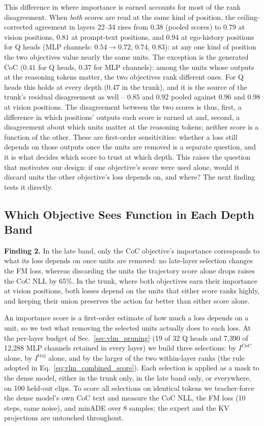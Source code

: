 This difference in where importance is earned accounts for most of the rank disagreement. When \emph{both} scores are read at the same kind of position, the ceiling-corrected agreement in layers 22--34 rises from $0.38$ (pooled scores) to $0.79$ at vision positions, $0.81$ at prompt-text positions, and $0.94$ at ego-history positions for Q heads (MLP channels: $0.54\!\to\!0.72$, $0.74$, $0.83$): at any one kind of position the two objectives value nearly the same units. The exception is the generated CoC ($0.41$ for Q heads, $0.37$ for MLP channels): among the units whose outputs at the reasoning tokens matter, the two objectives rank different ones. For Q heads this holds at every depth ($0.47$ in the trunk), and it is the source of the trunk's residual disagreement as well -- $0.85$ and $0.92$ pooled against $0.96$ and $0.98$ at vision positions. The disagreement between the two scores is thus, first, a difference in which positions' outputs each score is earned at and, second, a disagreement about which units matter at the reasoning tokens; neither score is a function of the other. These are first-order sensitivities: whether a loss still depends on those outputs once the units are removed is a separate question, and it is what decides which score to trust at which depth. This raises the question that motivates our design: if one objective's score were used alone, would it discard units the other objective's loss depends on, and where? The next finding tests it directly.

\subsection{Which Objective Sees Function in Each Depth Band}
\label{sec:band_ablation}

\begin{finding}
\textbf{Finding 2.} In the late band, only the CoC objective's importance corresponds to what its loss depends on once units are removed: no late-layer selection changes the FM loss, whereas discarding the units the trajectory score alone drops raises the CoC NLL by 65\%. In the trunk, where both objectives earn their importance at vision positions, both losses depend on the units that either score ranks highly, and keeping their union preserves the action far better than either score alone.
\end{finding}

An importance score is a first-order estimate of how much a loss depends on a unit, so we test what removing the selected units actually does to each loss. At the per-layer budget of Sec.~\ref{sec:vlm_pruning} (19 of 32 Q heads and 7{,}390 of 12{,}288 MLP channels retained in every layer) we build three selections: by $I^{\mathrm{CoC}}$ alone, by $I^{\mathrm{traj}}$ alone, and by the larger of the two within-layer ranks (the rule adopted in Eq.~\ref{eq:vlm_combined_score}). Each selection is applied as a mask to the dense model, either in the trunk only, in the late band only, or everywhere, on 100 held-out clips. To score all selections on identical tokens we teacher-force the dense model's own CoC text and measure the CoC NLL, the FM loss (10 steps, same noise), and minADE over 8 samples; the expert and the KV projections are untouched throughout.

